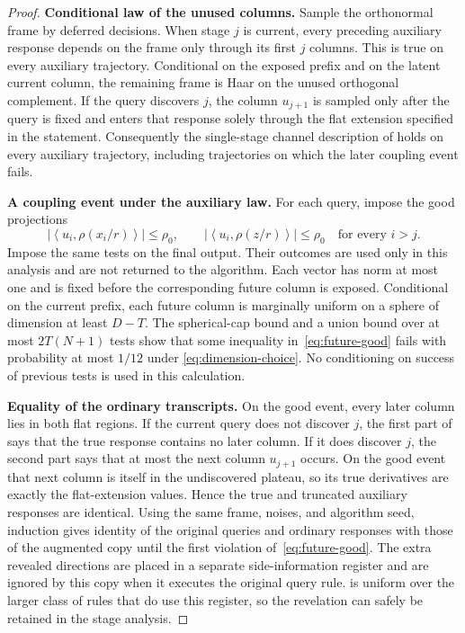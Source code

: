 \documentclass[11pt]{article}
\newcommand{\ip}[2]{\left\langle #1,#2\right\rangle}
\theoremstyle{definition}
\theoremstyle{remark}
\begin{document}
\begin{proof}
\noindent\textbf{Conditional law of the unused columns.}
Sample the orthonormal frame by deferred decisions.  When stage $j$ is
current, every preceding auxiliary response depends on the frame only through
its first $j$ columns.  This is true on every auxiliary trajectory.
Conditional on the exposed prefix and on the latent current column, the
remaining frame is Haar on the unused orthogonal complement.  If the query discovers $j$, the column $u_{j+1}$ is sampled only
after the query is fixed and enters that response solely through the flat
extension specified in the statement.  Consequently the single-stage channel
description of  holds on every auxiliary
trajectory, including trajectories on which the later coupling event fails.

\noindent\textbf{A coupling event under the auxiliary law.}
For each query, impose the good projections
\begin{equation}\label{eq:future-good}
 |\ip{u_i}{\rho(x_i/r)}|\le\rho_0,
 \qquad
 |\ip{u_i}{\rho(z/r)}|\le\rho_0
 \quad\text{for every }i>j.
\end{equation}
Impose the same tests on the final output.  Their outcomes are used only in
this analysis and are not returned to the algorithm.  Each vector has norm
at most one and is fixed before the corresponding future column is exposed.
Conditional on the current prefix, each future column is marginally uniform
on a sphere of dimension at least $D-T$.  The spherical-cap bound and a union
bound over at most $2T(N+1)$ tests show that some inequality
in~\eqref{eq:future-good} fails with probability at most $1/12$ under
\eqref{eq:dimension-choice}.  No conditioning on success of previous tests is
used in this calculation.

\noindent\textbf{Equality of the ordinary transcripts.}
On the good event, every later column lies in both flat regions.  If the current
query does not discover $j$, the first part of
 says that the true response contains no later
column.  If it does discover $j$, the second part says that at most the next
column $u_{j+1}$ occurs.  On the good event that next column is itself in the
undiscovered plateau, so its true derivatives are exactly the flat-extension
values.  Hence the true and truncated auxiliary responses are identical.  Using the same frame, noises, and algorithm seed, induction gives identity
of the original queries and ordinary responses with those of the augmented
copy until the first violation of~\eqref{eq:future-good}.  The extra revealed
directions are placed in a separate side-information register and are ignored
by this copy when it executes the original query rule.  
is uniform over the larger class of rules that do use this register, so the
revelation can safely be retained in the stage analysis.
\end{proof}
\end{document}
